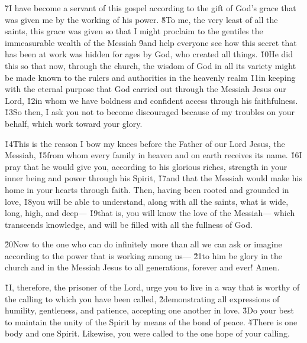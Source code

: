 \v{7}I have become a servant of this gospel according to the gift of God's grace that was given me by the working of his power. \v{8}To me, the very least of all the saints, this grace was given so that I might proclaim to the gentiles the immeasurable wealth of the Messiah \v{9}and help everyone see how this secret that has been at work was hidden for ages by God, who created all things. \v{10}He did this so that now, through the church, the wisdom of God in all its variety might be made known to the rulers and authorities in the heavenly realm \v{11}in keeping with the eternal purpose that God carried out through the Messiah Jesus our Lord, \v{12}in whom we have boldness and confident access through his faithfulness. \v{13}So then, I ask you not to become discouraged because of my troubles on your behalf, which work toward your glory.

\v{14}This is the reason I bow my knees before the Father of our Lord Jesus, the Messiah, \v{15}from whom every family in heaven and on earth receives its name. \v{16}I pray that he would give you, according to his glorious riches, strength in your inner being and power through his Spirit, \v{17}and that the Messiah would make his home in your hearts through faith. Then, having been rooted and grounded in love, \v{18}you will be able to understand, along with all the saints, what is wide, long, high, and deep--- \v{19}that is, you will know the love of the Messiah--- which transcends knowledge, and will be filled with all the fullness of God.

\v{20}Now to the one who can do infinitely more than all we can ask or imagine according to the power that is working among us--- \v{21}to him be glory in the church and in the Messiah Jesus to all generations, forever and ever! Amen.

\v{1}I, therefore, the prisoner of the Lord, urge you to live in a way that is worthy of the calling to which you have been called, \v{2}demonstrating all expressions of humility, gentleness, and patience, accepting one another in love. \v{3}Do your best to maintain the unity of the Spirit by means of the bond of peace. \v{4}There is one body and one Spirit. Likewise, you were called to the one hope of your calling.

